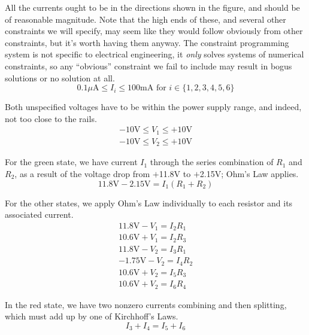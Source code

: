 All the currents ought to be in the directions shown in the figure, and
should be of reasonable magnitude.  Note that the high ends of these, and
several other constraints we will specify, may seem like they would follow
obviously from other constraints, but it's worth having them anyway.  The
constraint programming system is not specific to electrical engineering, it
\emph{only} solves systems of numerical constraints, so any ``obvious''
constraint we fail to include may result in bogus solutions or no solution
at all.
\begin{equation*}
  0.1\mu\textrm{A} \le I_i \le 100\textrm{mA for } i \in \{1,2,3,4,5,6\}
\end{equation*}

Both unspecified voltages have to be within the power supply range, and
indeed, not too close to the rails.
\begin{gather*}
  -10\textrm{V} \le V_1 \le +10\textrm{V} \\
  -10\textrm{V} \le V_2 \le +10\textrm{V}
\end{gather*}

For the green state, we have current $I_1$ through the series
combination of $R_1$ and $R_2$, as a result of the voltage drop from
$+$11.8V to $+$2.15V; Ohm's Law applies.
\begin{equation*}
  11.8\textrm{V}-2.15\textrm{V} = I_1(R_1+R_2)
\end{equation*}

For the other states, we apply Ohm's Law individually to each resistor and
its associated current.
\begin{gather*}
  11.8\textrm{V}-V_1 = I_2R_1 \\
  10.6\textrm{V}+V_1 = I_2R_3 \\
  11.8\textrm{V}-V_2 = I_3R_1 \\
  -1.75\textrm{V}-V_2 = I_4R_2 \\
  10.6\textrm{V}+V_2 = I_5R_3 \\
  10.6\textrm{V}+V_2 = I_6R_4
\end{gather*}

In the red state, we have two nonzero currents combining and then
splitting, which must add up by one of Kirchhoff's Laws.
\begin{equation*}
  I_3+I_4=I_5+I_6
\end{equation*}

